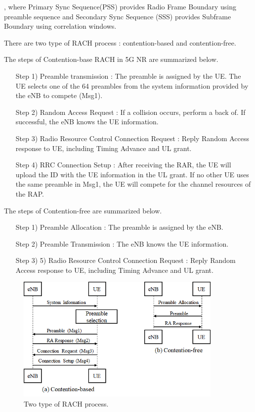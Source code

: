 , where Primary Sync Sequence(PSS) provides Radio Frame Boundary using preamble sequence and Secondary Sync Sequence (SSS) provides Subframe Boundary using correlation windows.

There are two type of RACH process : contention-based and contention-free. 

The steps of Contention-base RACH in 5G NR are summarized below.
\begin{enumerate}[leftmargin=\leftmargin+\widthof{Prefix}]
\item[Step 1)] Preamble transmission : The preamble is assigned by the UE. The UE selects one of the 64 preambles from the system information provided by the eNB to compete (Msg1).
\item[Step 2)]Random Access Request : If a collision occurs, perform a back of. If successful, the eNB knows the UE information.
\item[Step 3)]Radio Resource Control Connection Request : Reply Random Access response to UE, including Timing Advance and UL grant.
\item[Step 4)] RRC Connection Setup : After receiving the RAR, the UE will upload the ID with the UE information in the UL grant. If no other UE uses the same preamble in Msg1, the UE will compete for the channel resources of the RAP.
\end{enumerate}


The steps of Contention-free are summarized below.
\begin{enumerate}[leftmargin=\leftmargin+\widthof{Prefix}]
\item[Step 1)] Preamble Allocation : The preamble is assigned by the eNB.
\item[Step 2)] Preamble Transmission : The eNB knows the UE information.
\item[Step 3)] 5)	Radio Resource Control Connection Request : Reply Random Access response to UE, including Timing Advance and UL grant.
\end{enumerate}

\begin{figure}[t!]
 \centering
 \includegraphics[width=10cm]{fig/RACH_contention_based_free.png}
 \caption{Two type of RACH process.}
 \label{fig:RACH_contention}
\end{figure}

